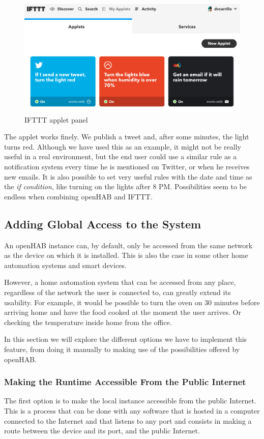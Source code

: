 \begin{figure}
	\centering
	\includegraphics[width=1\textwidth]{images/Chapter_07/iftt-applet-panel.png}
	\caption{IFTTT applet panel}
	\label{fig:iftt-applet-panel}
\end{figure}

The applet works finely. We publish a tweet and, after some minutes, the light turns red. Although we have used this as an example,
it might not be really useful in a real environment, but the end user could use a similar rule as a notification system every time
he is mentioned on Twitter, or when he receives new emails. It is also possible to set very useful rules with the date and time as
the \textit{if condition}, like turning on the lights after 8 PM. Possibilities seem to be endless when combining openHAB and IFTTT.

\subsection{Adding Global Access to the System}
An openHAB instance can, by default, only be accessed from the same network as the device on which it is installed. This is also
the case in some other home automation systems and smart devices.

However, a home automation system that can be accessed from any place, regardless of the network the user is connected to, can
greatly extend its usability. For example, it would be possible to turn the oven on 30 minutes before arriving home and have the
food cooked at the moment the user arrives. Or checking the temperature inside home from the office.

In this section we will explore the different options we have to implement this feature, from doing it manually to making use of
the possibilities offered by openHAB.

\subsubsection{Making the Runtime Accessible From the Public Internet}
The first option is to make the local instance accessible from the public Internet. This is a process that can be done with any
software that is hosted in a computer connected to the Internet and that listens to any port and consists in making a route
between the device and its port, and the public Internet.\cite{nchPublicInternet}

